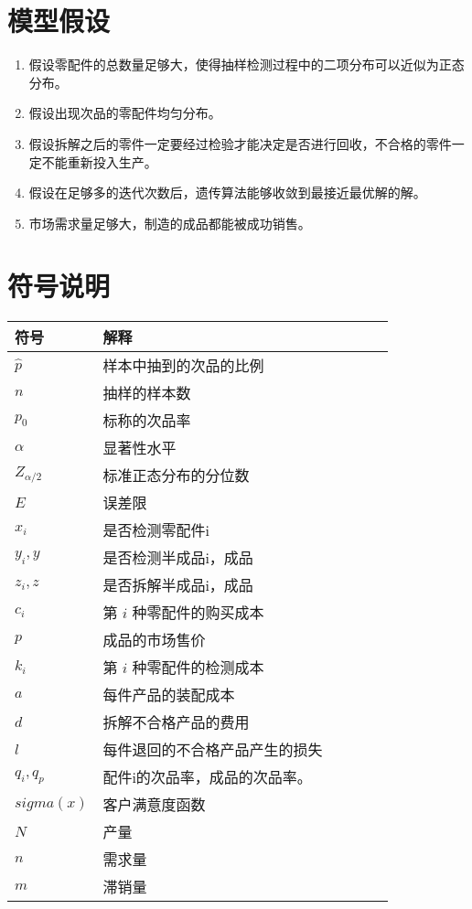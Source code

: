 \documentclass[utf8]{ctexart} %
\begin{document}
		\section{模型假设}
		\begin{enumerate}[itemsep=0pt, parsep=0pt, label=\arabic*] %
			\item 假设零配件的总数量足够大，使得抽样检测过程中的二项分布可以近似为正态分布。
			\item 假设出现次品的零配件均匀分布。
			\item 假设拆解之后的零件一定要经过检验才能决定是否进行回收，不合格的零件一定不能重新投入生产。
			\item 假设在足够多的迭代次数后，遗传算法能够收敛到最接近最优解的解。
			\item 市场需求量足够大，制造的成品都能被成功销售。
		\end{enumerate}
	\section{符号说明}
		\begin{longtable}[htbp!]{l|lllll} %
	\toprule
	符号&解释&\\
	\midrule
	$\hat{p}$&样本中抽到的次品的比例\\
	$n$&抽样的样本数\\
	$p_0$&标称的次品率\\
	$\alpha$&显著性水平\\
	$Z_{\alpha/2}$&标准正态分布的分位数\\
	$E$&误差限\\
	$x_i$&是否检测零配件i\\
	$y_i,y$&是否检测半成品i，成品\\
	$z_i,z$&是否拆解半成品i，成品\\
	$c_i$&第 $i$ 种零配件的购买成本\\
	$p$&成品的市场售价\\
	$k_i$&第 $i$ 种零配件的检测成本\\
	$a$&每件产品的装配成本\\
	$d$&拆解不合格产品的费用\\
	$l$&每件退回的不合格产品产生的损失\\
	$q_i,q_p$&配件i的次品率，成品的次品率。\\
	$sigma(x)$&客户满意度函数\\
	$N$&产量\\
	$n$&需求量\\
	$m$&滞销量\\
	\bottomrule
\end{longtable}
\end{document}
